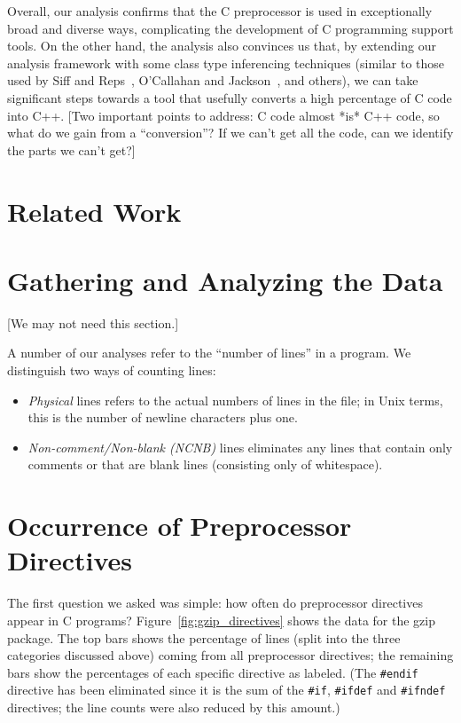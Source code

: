 Overall, our analysis confirms that the C preprocessor is used in
exceptionally broad and diverse ways, complicating the development of C
programming support tools.  On the other hand, the analysis also
convinces us that, by extending our analysis framework with some class
type inferencing techniques (similar to those used by Siff and
Reps~\cite{Siff-fse96}, O'Callahan and Jackson~\cite{OCallahan-icse97},
and others), we can take significant steps towards a tool that usefully
converts a high percentage of C code into C++.  [Two important points to
address: C code almost *is* C++ code, so what do we gain from a
``conversion''?  If we can't get all the code, can we identify the parts
we can't get?]

\section{Related Work}\label{sec:related}

\section{Gathering and Analyzing the Data}\label{sec:gathering}

[We may not need this section.]

A number of our analyses refer to the ``number of lines'' in a
program.  We distinguish two ways of counting lines:
\begin{itemize}

\item {\em Physical} lines refers to the actual numbers of lines in
the file; in Unix terms, this is the number of newline characters plus
one.

\item {\em Non-comment/Non-blank (NCNB)} lines eliminates any lines
that contain only comments or that are blank lines (consisting only of
whitespace).

\end{itemize}

\section{Occurrence of Preprocessor Directives}\label{sec:directives}

The first question we asked was simple: how often do preprocessor
directives appear in C programs?  Figure~\ref{fig:gzip_directives} shows
the data for the gzip package.  The top bars shows the percentage of
lines (split into the three categories discussed above) coming from all
preprocessor directives; the remaining bars show the percentages of each
specific directive as labeled.  (The \verb+#endif+ directive has been
eliminated since it is the sum of the \verb+#if+, \verb+#ifdef+ and
\verb+#ifndef+ directives; the line counts were also reduced by this
amount.)

